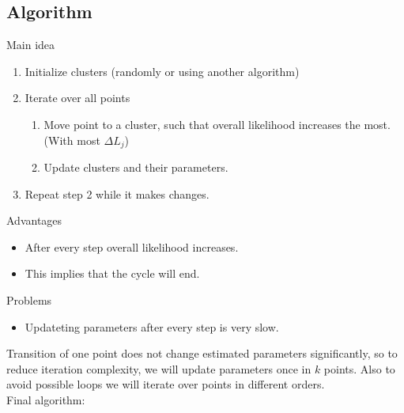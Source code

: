 \documentclass[a4paper, 12pt]{article}
\theoremstyle{definition}
\theoremstyle{definition}
\theoremstyle{remark}
\begin{document}
\subsection{Algorithm}
Main idea
\begin{enumerate}
    \item Initialize clusters (randomly or using another algorithm)
    \item Iterate over all points
    \begin{enumerate}
        \item Move point to a cluster, such that overall likelihood increases the most. (With most $\Delta L_j$)
        \item Update clusters and their parameters.
    \end{enumerate}
    \item Repeat step 2 while it makes changes.
\end{enumerate}
Advantages
\begin{itemize}
    \item After every step overall likelihood increases.
    \item This implies that the cycle will end.
\end{itemize}
Problems
\begin{itemize}
    \item Updateting parameters after every step is very slow.
\end{itemize}
Transition of one point does not change estimated parameters significantly, 
so to reduce iteration complexity, we will update parameters once in $k$ points. 
Also to avoid possible loops we will iterate over points in different orders. \\
Final algorithm:
\end{document}
